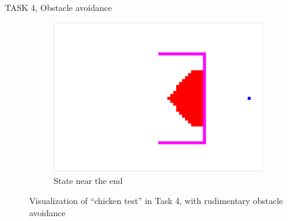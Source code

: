\documentclass[10pt,a4paper]{article}
\begin{document}
\begin{task}{TASK 4, Obstacle avoidance}
\begin{figure}[htbp]
\begin{subfigure}[b]{0.31\textwidth}
    \includegraphics[width=\textwidth]{pictures/Task4_end_cr.png}
    \caption{State near the end}
    \label{fig:Task4_end_cr}
  \end{subfigure}
  \caption{Visualization of ``chicken test'' in Task 4, with rudimentary obstacle avoidance}
  \label{fig:task4cr}
\end{figure}


\end{task}
\end{document}
